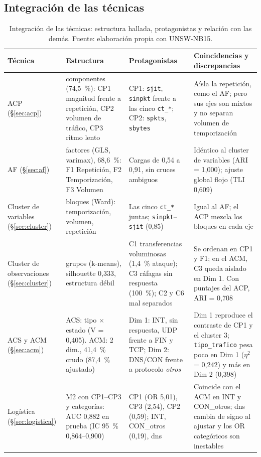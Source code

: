 \subsection{Integración de las técnicas}
\label{anexo:integracion}
\begin{table}[htbp]
  \centering
  \caption[Integración de las técnicas]{Integración de las técnicas: estructura hallada, protagonistas y relación con las demás. Fuente: elaboración propia con UNSW-NB15.}\label{tab:a-integracion}
  \begin{tablacompacta}
  \footnotesize
  \setlength{\tabcolsep}{3pt}
  \begin{tabularx}{\linewidth}{@{}>{\raggedright\arraybackslash}p{1.9cm}>{\raggedright\arraybackslash}X>{\raggedright\arraybackslash}X>{\raggedright\arraybackslash}X@{}}
  \toprule
  Técnica & Estructura & Protagonistas & Coincidencias y discrepancias \\
  \midrule
  ACP (§\ref{sec:acp}) & 3 componentes (74,5~\%): CP1 magnitud frente a repetición, CP2 volumen de tráfico, CP3 ritmo lento & CP1: \texttt{sjit}, \texttt{sinpkt} frente a las cinco \texttt{ct\_*}; CP2: \texttt{spkts}, \texttt{sbytes} & Aísla la repetición, como el AF; pero sus ejes son mixtos y no separan volumen de temporización \\
  AF (§\ref{sec:af}) & 3 factores (GLS, varimax), 68,6~\%: F1 Repetición, F2 Temporización, F3 Volumen & Cargas de 0,54 a 0,91, sin cruces ambiguos & Idéntico al cluster de variables (ARI = 1,000); ajuste global flojo (TLI 0,609) \\
  Cluster de variables (§\ref{sec:cluster}) & 3 bloques (Ward): temporización, volumen, repetición & Las cinco \texttt{ct\_*} juntas; \texttt{sinpkt}--\texttt{sjit} (0,85) & Igual al AF; el ACP mezcla los bloques en cada eje \\
  Cluster de observaciones (§\ref{sec:cluster}) & 6 grupos (k-means), silhouette 0,333, estructura débil & C1 transferencias voluminosas (1,4~\% ataque); C3 ráfagas sin respuesta (100~\%); C2 y C6 mal separados & Se ordenan en CP1 y F1; en el ACM, C3 queda aislado en Dim 1. Con puntajes del ACP, ARI = 0,708 \\
  ACS y ACM (§\ref{sec:acm}) & ACS: tipo $\times$ estado (V = 0,405). ACM: 2 dim., 41,4~\% crudo (87,4~\% ajustado) & Dim 1: INT, sin respuesta, UDP frente a FIN y TCP; Dim 2: DNS/CON frente a protocolo \emph{otros} & Dim 1 reproduce el contraste de CP1 y el cluster 3; \texttt{tipo\_trafico} pesa poco en Dim 1 ($\eta^2$ = 0,242) y más en Dim 2 (0,398) \\
  Logística (§\ref{sec:logistica}) & M2 con CP1--CP3 y categorías: AUC 0,882 en prueba (IC 95~\% 0,864--0,900) & CP1 (OR 5,01), CP3 (2,54), CP2 (0,59); INT, CON\_otros (0,19), dns & Coincide con el ACM en INT y CON\_otros; dns cambia de signo al ajustar y los OR categóricos son inestables \\
  \bottomrule
  \end{tabularx}
  \end{tablacompacta}
\end{table}
\FloatBarrier
